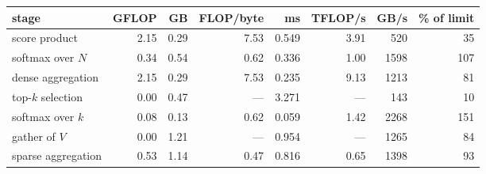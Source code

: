 \begin{tabular}{lrrrrrrr}
\toprule
\textbf{stage} & GFLOP & GB & FLOP/byte & ms & TFLOP/s & GB/s & \% of limit \\
\midrule
score product & 2.15 & 0.29 & 7.53 & 0.549 & 3.91 & 520 & 35 \\
softmax over $N$ & 0.34 & 0.54 & 0.62 & 0.336 & 1.00 & 1598 & 107 \\
dense aggregation & 2.15 & 0.29 & 7.53 & 0.235 & 9.13 & 1213 & 81 \\
top-$k$ selection & 0.00 & 0.47 & --- & 3.271 & --- & 143 & 10 \\
softmax over $k$ & 0.08 & 0.13 & 0.62 & 0.059 & 1.42 & 2268 & 151 \\
gather of $V$ & 0.00 & 1.21 & --- & 0.954 & --- & 1265 & 84 \\
sparse aggregation & 0.53 & 1.14 & 0.47 & 0.816 & 0.65 & 1398 & 93 \\
\bottomrule
\end{tabular}%
